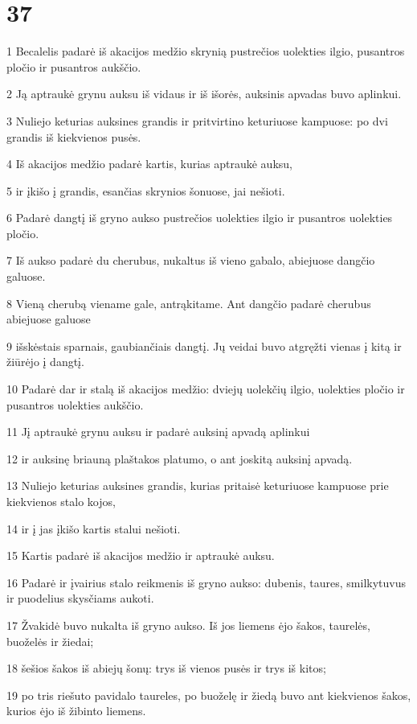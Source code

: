 \chapter{37}


\par 1 Becalelis padarė iš akacijos medžio skrynią pustrečios uolekties ilgio, pusantros pločio ir pusantros aukščio. 
\par 2 Ją aptraukė grynu auksu iš vidaus ir iš išorės, auksinis apvadas buvo aplinkui. 
\par 3 Nuliejo keturias auksines grandis ir pritvirtino keturiuose kampuose: po dvi grandis iš kiekvienos pusės. 
\par 4 Iš akacijos medžio padarė kartis, kurias aptraukė auksu, 
\par 5 ir įkišo į grandis, esančias skrynios šonuose, jai nešioti. 
\par 6 Padarė dangtį iš gryno aukso pustrečios uolekties ilgio ir pusantros uolekties pločio. 
\par 7 Iš aukso padarė du cherubus, nukaltus iš vieno gabalo, abiejuose dangčio galuose. 
\par 8 Vieną cherubą viename gale, antrą­kitame. Ant dangčio padarė cherubus abiejuose galuose 
\par 9 išskėstais sparnais, gaubiančiais dangtį. Jų veidai buvo atgręžti vienas į kitą ir žiūrėjo į dangtį. 
\par 10 Padarė dar ir stalą iš akacijos medžio: dviejų uolekčių ilgio, uolekties pločio ir pusantros uolekties aukščio. 
\par 11 Jį aptraukė grynu auksu ir padarė auksinį apvadą aplinkui 
\par 12 ir auksinę briauną plaštakos platumo, o ant jos­kitą auksinį apvadą. 
\par 13 Nuliejo keturias auksines grandis, kurias pritaisė keturiuose kampuose prie kiekvienos stalo kojos, 
\par 14 ir į jas įkišo kartis stalui nešioti. 
\par 15 Kartis padarė iš akacijos medžio ir aptraukė auksu. 
\par 16 Padarė ir įvairius stalo reikmenis iš gryno aukso: dubenis, taures, smilkytuvus ir puodelius skysčiams aukoti. 
\par 17 Žvakidė buvo nukalta iš gryno aukso. Iš jos liemens ėjo šakos, taurelės, buoželės ir žiedai; 
\par 18 šešios šakos iš abiejų šonų: trys iš vienos pusės ir trys iš kitos; 
\par 19 po tris riešuto pavidalo taureles, po buoželę ir žiedą buvo ant kiekvienos šakos, kurios ėjo iš žibinto liemens. 
